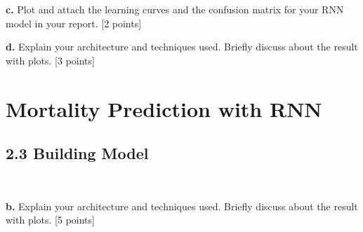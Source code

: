\documentclass[12pt]{article}
\begin{document}
\bigskip

\textbf{c.} Plot and attach the learning curves and the confusion matrix for your RNN model in your report. [2 points]

\bigskip

\textbf{d.} Explain your architecture and techniques used. Briefly discuss about the result with plots. [3 points]

\section{Mortality Prediction with RNN}

\subsection*{2.3 Building Model}
~

\textbf{b.} Explain your architecture and techniques used. Briefly discuss about the result with plots. [5 points]
\end{document}
